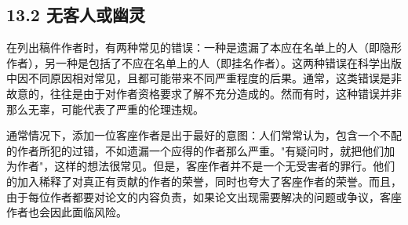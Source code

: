 \subsection*{13.2 无客人或幽灵}
在列出稿件作者时，有两种常见的错误：一种是遗漏了本应在名单上的人（即隐形作者），另一种是包括了不应在名单上的人（即挂名作者）。这两种错误在科学出版中因不同原因相对常见，且都可能带来不同严重程度的后果。通常，这类错误是非故意的，往往是由于对作者资格要求了解不充分造成的。然而有时，这种错误并非那么无辜，可能代表了严重的伦理违规。

通常情况下，添加一位客座作者是出于最好的意图：人们常常认为，包含一个不配的作者所犯的过错，不如遗漏一个应得的作者那么严重。"有疑问时，就把他们加为作者"，这样的想法很常见。但是，客座作者并不是一个无受害者的罪行。他们的加入稀释了对真正有贡献的作者的荣誉，同时也夸大了客座作者的荣誉。而且，由于每位作者都要对论文的内容负责，如果论文出现需要解决的问题或争议，客座作者也会因此面临风险。

